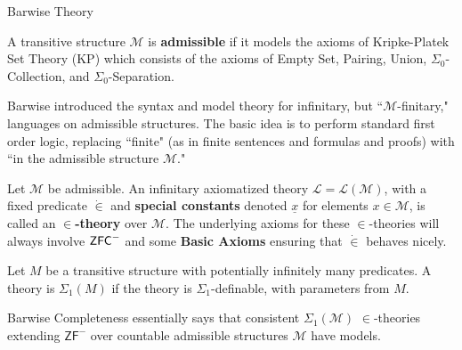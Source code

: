 \documentclass[utf8x,xcolor=svgnames,8pt]{beamer}
\newcommand{\M}{\mathcal{M}}
\newcommand{\ZFC}{\textup{\ensuremath{\textsf{ZFC}}}}
\begin{document}
\begin{frame}{Barwise Theory}
\begin{definition} A transitive structure $\M$ is \textbf{admissible} if it models the axioms of \textsf{Kripke-Platek Set Theory} (\textsf{KP}) which consists of the axioms of \textsf{Empty Set}, \textsf{Pairing}, \textsf{Union}, $\Sigma_0$-\textsf{Collection}, and $\Sigma_0$-\textsf{Separation}. \end{definition}

Barwise introduced the syntax and model theory for infinitary, but ``$\M$-finitary," languages on admissible structures. The basic idea is to perform standard first order logic, replacing ``finite" (as in finite sentences and formulas and proofs) with ``in the admissible structure $\mathcal M$."

%
\begin{definition}[$\in$-theory] Let $\M$ be admissible. An infinitary axiomatized theory $\mathcal L=\mathcal L(\M)$, with a fixed predicate $\dot \in$ and \textbf{special constants} denoted $\underline x$ for elements $x \in \M$, is called an \textbf{$\in$-theory} over $\M$. The underlying axioms for these $\in$-theories will always involve $\ZFC^-$ and some \textbf{Basic Axioms} ensuring that $\dot \in$ behaves nicely. \end{definition}

\begin{definition} Let $M$ be a transitive structure with potentially infinitely many predicates. A theory is $\Sigma_1(M)$ if the theory is $\Sigma_1$-definable, with parameters from $M$. \end{definition}

Barwise Completeness essentially says that consistent $\Sigma_1(\M)$ $\in$-theories extending $\textsf{ZF}^-$ over countable admissible structures $\M$ have models.
\end{frame}
\end{document}
